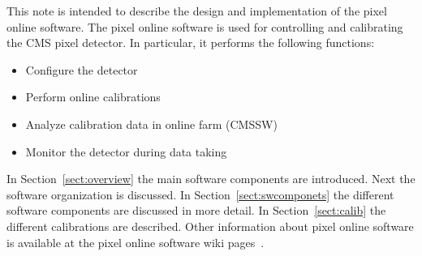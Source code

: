 
This note is intended to describe the design and implementation of the
pixel online software. The pixel online software is used for controlling and calibrating the CMS pixel
detector. In particular, it performs the following functions:
\begin{itemize}
\item Configure the detector
\item Perform online calibrations
\item Analyze calibration data in online farm (CMSSW)
\item Monitor the detector during data taking
\end{itemize}

In Section~\ref{sect:overview} the main software components 
are introduced. Next the software organization is discussed.
In Section~\ref{sect:swcomponets} the different software components
are discussed in more detail. In Section~\ref{sect:calib} the
different calibrations are described. Other information about
pixel online software is available at the pixel online
software wiki pages~\cite{poswiki}.

